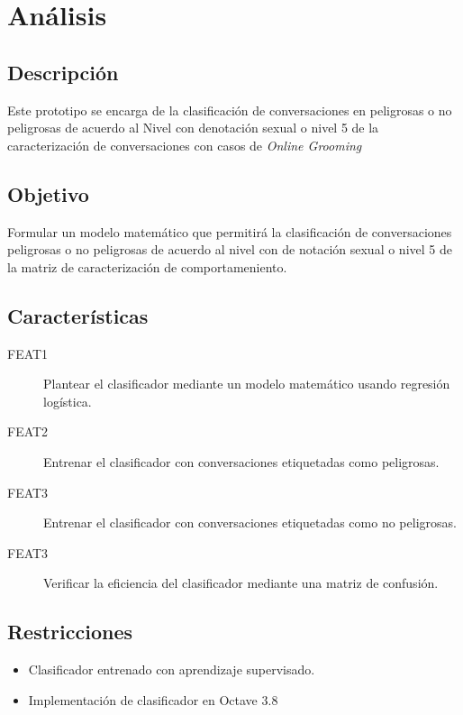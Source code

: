 \section{An\'alisis}

\subsection{Descripci\'on}

Este prototipo se encarga de la clasificaci\'on de conversaciones en peligrosas o no peligrosas de acuerdo al Nivel con denotaci\'on sexual o nivel 5 de la caracterizaci\'on de conversaciones con casos de \textit{Online Grooming}

\subsection{Objetivo}
Formular un modelo matem\'atico que permitir\'a la clasificaci\'on de conversaciones peligrosas o no peligrosas de acuerdo al nivel con de notaci\'on sexual o nivel 5 de la matriz de caracterizaci\'on de comportameniento.

\subsection{Caracter\'isticas}
\begin{description}
\item[FEAT1] Plantear el clasificador mediante un modelo matem\'atico usando regresi\'on log\'istica.
\item[FEAT2] Entrenar el clasificador con conversaciones etiquetadas como peligrosas.
\item[FEAT3] Entrenar el clasificador con conversaciones etiquetadas como no peligrosas.
\item[FEAT3] Verificar la eficiencia del clasificador mediante una matriz de confusi\'on.
\end{description}			

\subsection{Restricciones}

\begin{itemize}
\item Clasificador entrenado con aprendizaje supervisado.
\item Implementaci\'on de clasificador en Octave 3.8
\end{itemize}


